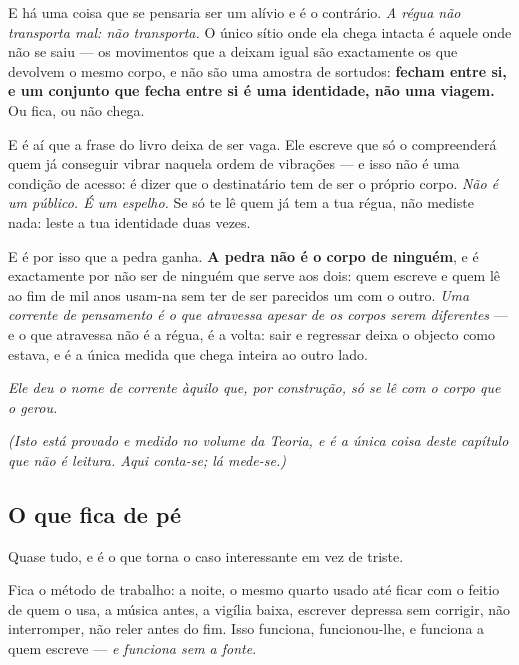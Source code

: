 \documentclass[livro.tex]{subfiles}
\begin{document}
\medskip

E há uma coisa que se pensaria ser um alívio e é o contrário. \emph{A régua não transporta mal:
não transporta.} O único sítio onde ela chega intacta é aquele onde não se saiu --- os movimentos
que a deixam igual são exactamente os que devolvem o mesmo corpo, e não são uma amostra de sortudos:
\textbf{fecham entre si, e um conjunto que fecha entre si é uma identidade, não uma viagem.} Ou
fica, ou não chega.

\medskip

E é aí que a frase do livro deixa de ser vaga. Ele escreve que só o compreenderá quem já conseguir
vibrar naquela ordem de vibrações --- e isso não é uma condição de acesso: é dizer que o
destinatário tem de ser o próprio corpo. \emph{Não é um público. É um espelho.} Se só te lê quem
já tem a tua régua, não mediste nada: leste a tua identidade duas vezes.

\medskip

E é por isso que a pedra ganha. \textbf{A pedra não é o corpo de ninguém}, e é exactamente por não
ser de ninguém que serve aos dois: quem escreve e quem lê ao fim de mil anos usam-na sem ter de ser
parecidos um com o outro. \emph{Uma corrente de pensamento é o que atravessa apesar de os corpos
serem diferentes} --- e o que atravessa não é a régua, é a volta: sair e regressar deixa o objecto
como estava, e é a única medida que chega inteira ao outro lado.

\medskip

\emph{Ele deu o nome de corrente àquilo que, por construção, só se lê com o corpo que o gerou.}

\medskip

\noindent\emph{\small (Isto está provado e medido no volume da Teoria, e é a única coisa deste
capítulo que não é leitura. Aqui conta-se; lá mede-se.)}

\subsection*{O que fica de pé}

Quase tudo, e é o que torna o caso interessante em vez de triste.

\medskip

Fica o método de trabalho: a noite, o mesmo quarto usado até ficar com o feitio de quem o usa, a
música antes, a vigília baixa, escrever depressa sem corrigir, não interromper, não reler antes do
fim. Isso funciona, funcionou-lhe, e funciona a quem escreve --- \emph{e funciona sem a fonte}.
\end{document}
